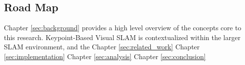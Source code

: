 \subsection{Road Map}

Chapter \ref{sec:background} provides a high level overview of the concepts core to this research. Keypoint-Based Visual SLAM is contextualized within the larger SLAM environment, and the 
Chapter \ref{sec:related_work}
Chapter \ref{sec:implementation}
Chapter \ref{sec:analysis}
Chapter \ref{sec:conclusion}
